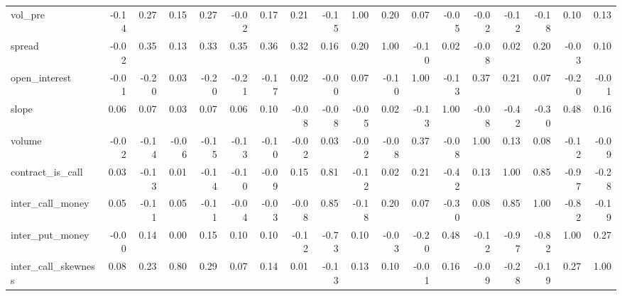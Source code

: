 \begin{tabular}{lrrrrrrrrrrrrrrrrr}
vol\_pre             &    -0.14 &        0.27 &      0.15 &    0.27 &         -0.02 &        0.17 &  0.21 &    -0.15 &     1.00 &    0.20 &           0.07 &  -0.05 &   -0.02 &             -0.12 &             -0.18 &             0.10 &                 0.13 \\
spread              &    -0.02 &        0.35 &      0.13 &    0.33 &          0.35 &        0.36 &  0.32 &     0.16 &     0.20 &    1.00 &          -0.10 &   0.02 &   -0.08 &              0.02 &              0.20 &            -0.03 &                 0.10 \\
open\_interest       &    -0.01 &       -0.20 &      0.03 &   -0.20 &         -0.21 &       -0.17 &  0.02 &    -0.00 &     0.07 &   -0.10 &           1.00 &  -0.13 &    0.37 &              0.21 &              0.07 &            -0.20 &                -0.01 \\
slope               &     0.06 &        0.07 &      0.03 &    0.07 &          0.06 &        0.10 & -0.08 &    -0.08 &    -0.05 &    0.02 &          -0.13 &   1.00 &   -0.08 &             -0.42 &             -0.30 &             0.48 &                 0.16 \\
volume              &    -0.02 &       -0.14 &     -0.06 &   -0.15 &         -0.13 &       -0.10 & -0.02 &     0.03 &    -0.02 &   -0.08 &           0.37 &  -0.08 &    1.00 &              0.13 &              0.08 &            -0.12 &                -0.09 \\
contract\_is\_call    &     0.03 &       -0.13 &      0.01 &   -0.14 &         -0.10 &       -0.09 &  0.15 &     0.81 &    -0.12 &    0.02 &           0.21 &  -0.42 &    0.13 &              1.00 &              0.85 &            -0.97 &                -0.28 \\
inter\_call\_money    &     0.05 &       -0.11 &      0.05 &   -0.11 &         -0.04 &       -0.03 & -0.08 &     0.85 &    -0.18 &    0.20 &           0.07 &  -0.30 &    0.08 &              0.85 &              1.00 &            -0.82 &                -0.19 \\
inter\_put\_money     &    -0.00 &        0.14 &      0.00 &    0.15 &          0.10 &        0.10 & -0.12 &    -0.73 &     0.10 &   -0.03 &          -0.20 &   0.48 &   -0.12 &             -0.97 &             -0.82 &             1.00 &                 0.27 \\
inter\_call\_skewness &     0.08 &        0.23 &      0.80 &    0.29 &          0.07 &        0.14 &  0.01 &    -0.13 &     0.13 &    0.10 &          -0.01 &   0.16 &   -0.09 &             -0.28 &             -0.19 &             0.27 &                 1.00 \\
\bottomrule
\end{tabular}

